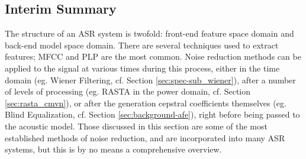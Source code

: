 % 

\subsection{Interim Summary}
% 
The structure of an ASR system is twofold: front-end feature space domain and back-end model space domain.  There are several techniques used to extract features; MFCC and PLP are the most common. Noise reduction methods can be applied to the signal at various times during this process, either in the time domain (eg. Wiener Filtering, cf. Section \ref{sec:spec-sub_wiener}), after a number of levels of processing (eg. RASTA in the power domain, cf. Section \ref{sec:rasta_cmvn}), or after the generation cepstral coefficients themselves (eg. Blind Equalization, cf. Section \ref{sec:background-afe}), right before being passed to the acoustic model.  Those discussed in this section are some of the most established methods of noise reduction, and are incorporated into many ASR systems, but this is by no means a comprehensive overview.  

